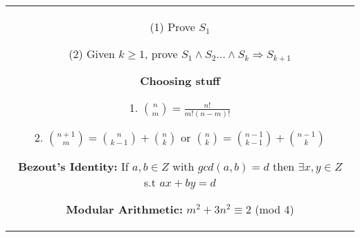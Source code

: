 \documentclass[a4paper]{article}
\begin{document}
\begin{tabular}{@{}c@{}}
\begin{minipage}[t][\paperheight][t]{0.49\paperwidth}
        (1) Prove $S_1$

        (2) Given $k \ge 1$, prove  $S_1\land S_2 \dots \land S_k \Rightarrow S_{k + 1}$  


        \textbf{Choosing stuff}
        
        1. ${n \choose m} = \frac{n!}{m!(n-m)!}$


        2. ${n + 1 \choose m } = {n \choose k - 1} + {n \choose k}$ or ${n \choose k} = {n - 1 \choose k - 1} + {n - 1 \choose k }$


        \textbf{Bezout's Identity: }If  $a,b \in Z$ with  $gcd(a,b) = d$ then  $\exists x,y \in Z$ s.t  $ax + by = d$


        \textbf{Modular Arithmetic: }  $m^2 + 3n^2 \equiv 2$ (mod 4)

    \end{minipage}%
    \end{tabular}%
\end{document}
